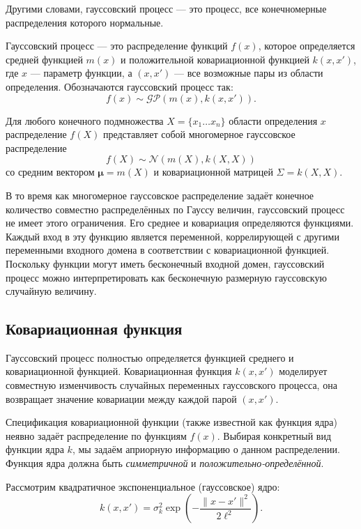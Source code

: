 \documentclass[11pt,a4paper]{article}
\begin{document}
Другими словами, гауссовский процесс --- это процесс, все конечномерные
распределения которого нормальные.

Гауссовский процесс --- это распределение функций \(f(x)\), которое
определяется средней функцией \(m(x)\) и положительной ковариационной
функцией \(k(x,x')\), где \(x\) --- параметр функции, а \((x,x')\) ---
все возможные пары из области определения. Обозначаются гауссовский
процесс так: \[
  f(x) \sim \mathcal{GP}(m(x), k(x,x')).
\]

    Для любого конечного подмножества \(X=\{x_1 \ldots x_n \}\) области
определения \(x\) распределение \(f(X)\) представляет собой многомерное
гауссовское распределение \[
  f(X) \sim \mathcal{N}(m(X), k(X, X))
\] со средним вектором \(\mathbf{\mu} = m(X)\) и ковариационной матрицей
\(\Sigma = k(X, X)\).

В то время как многомерное гауссовское распределение задаёт конечное
количество совместно распределённых по Гауссу величин, гауссовский
процесс не имеет этого ограничения. Его среднее и ковариация
определяются функциями. Каждый вход в эту функцию является переменной,
коррелирующей с другими переменными входного домена в соответствии с
ковариационной функцией. Поскольку функции могут иметь бесконечный
входной домен, гауссовский процесс можно интерпретировать как
бесконечную размерную гауссовскую случайную величину.

    \hypertarget{ux43aux43eux432ux430ux440ux438ux430ux446ux438ux43eux43dux43dux430ux44f-ux444ux443ux43dux43aux446ux438ux44f}{%
\subsection{Ковариационная
функция}\label{ux43aux43eux432ux430ux440ux438ux430ux446ux438ux43eux43dux43dux430ux44f-ux444ux443ux43dux43aux446ux438ux44f}}

Гауссовский процесс полностью определяется функцией среднего и
ковариационной функцией. Ковариационная функция \(k(x, x')\) моделирует
совместную изменчивость случайных переменных гауссовского процесса, она
возвращает значение ковариации между каждой парой \((x, x')\).

Спецификация ковариационной функции (также известной как функция ядра)
неявно задаёт распределение по функциям \(f(x)\). Выбирая конкретный вид
функции ядра \(k\), мы задаём априорную информацию о данном
распределении. Функция ядра должна быть \textit{симметричной} и
\textit{положительно-определённой}.

    Рассмотрим квадратичное экспоненциальное (гауссовское) ядро: \[
  k(x, x') = \sigma_k^2 \exp{ \left( -\frac{\lVert x - x' \rVert^2}{{2\ell^2}} \right) }.
\]
\end{document}
